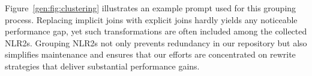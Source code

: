 


 Figure~\ref{gen:fig:clustering} illustrates an example prompt used for this grouping process. Replacing implicit joins with explicit joins hardly yields any noticeable performance gap, yet such transformations are often included among the collected NLR2s. Grouping NLR2s not only prevents redundancy in our repository but also simplifies maintenance and ensures that our efforts are concentrated on rewrite strategies that deliver substantial performance gains.












